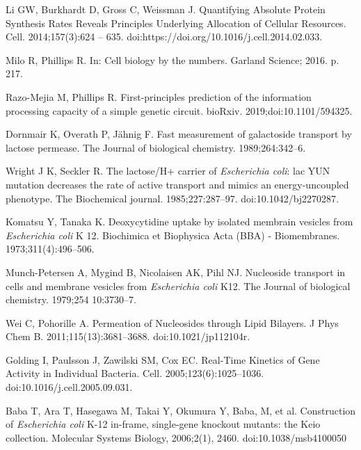 \documentclass[10pt,letterpaper]{article}
\begin{document}
\begin{thebibliography}{10}
	Li GW, Burkhardt D, Gross C, Weissman J.
	\newblock Quantifying Absolute Protein Synthesis Rates Reveals Principles
	Underlying Allocation of Cellular Resources.
	\newblock Cell. 2014;157(3):624 -- 635.
	\newblock doi:{https://doi.org/10.1016/j.cell.2014.02.033}.
	
	Milo R, Phillips R.
	\newblock In: Cell biology by the numbers. Garland Science; 2016. p. 217.
	
	Razo-Mejia M, Phillips R.
	\newblock First-principles prediction of the information processing capacity of
	a simple genetic circuit.
	\newblock bioRxiv. 2019;doi:{10.1101/594325}.
	
	Dornmair K, Overath P, Jähnig F.
	\newblock Fast measurement of galactoside transport by lactose permease.
	\newblock The Journal of biological chemistry. 1989;264:342--6.
	
	Wright J K, Seckler R.
	\newblock The lactose/H+ carrier of \emph{Escherichia coli}: lac YUN mutation
	decreases the rate of active transport and mimics an energy-uncoupled
	phenotype.
	\newblock The Biochemical journal. 1985;227:287--97.
	\newblock doi:{10.1042/bj2270287}.
	
	Komatsu Y, Tanaka K.
	\newblock Deoxycytidine uptake by isolated membrain vesicles from
	\emph{Escherichia coli} K 12.
	\newblock Biochimica et Biophysica Acta (BBA) - Biomembranes.
	1973;311(4):496--506.
	
	Munch-Petersen A, Mygind B, Nicolaisen AK, Pihl NJ.
	\newblock Nucleoside transport in cells and membrane vesicles from
	\emph{Escherichia coli} K12.
	\newblock The Journal of biological chemistry. 1979;254 10:3730--7.
	
	Wei C, Pohorille A.
	\newblock Permeation of Nucleosides through Lipid Bilayers.
	\newblock J Phys Chem B. 2011;115(13):3681--3688.
	\newblock doi:{10.1021/jp112104r}.
	
	Golding I, Paulsson J, Zawilski SM, Cox EC.
	\newblock Real-Time Kinetics of Gene Activity in Individual Bacteria.
	\newblock Cell. 2005;123(6):1025--1036.
	\newblock doi:{10.1016/j.cell.2005.09.031}.
	
	 Baba T, Ara T, Hasegawa M,
	Takai Y, Okumura Y, Baba, M, et al.
	\newblock Construction of \textit{Escherichia coli} K-12 in-frame,
	single-gene knockout mutants: the Keio collection.
	\newblock Molecular Systems Biology, 2006;2(1), 2460.
	\newblock doi:{10.1038/msb4100050}


\end{thebibliography}
\end{document}
